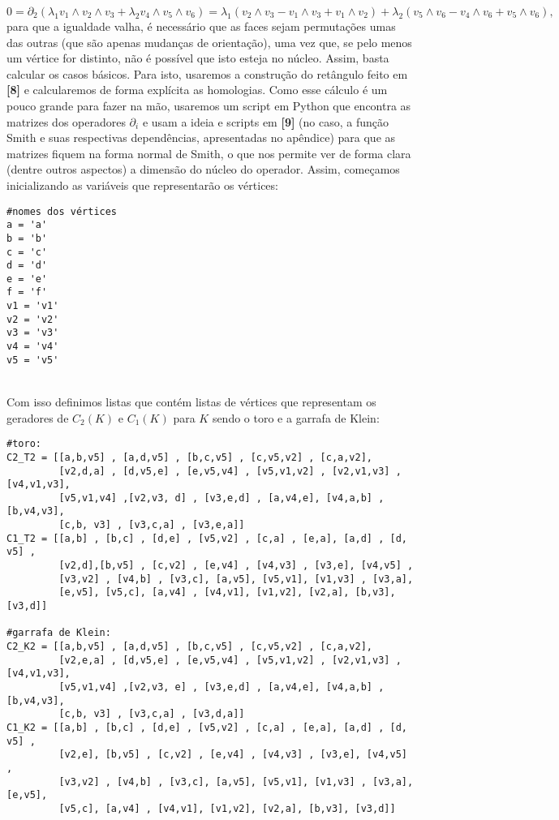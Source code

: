 \documentclass[12pt,a4paper]{article}
\theoremstyle{definition}
\begin{document}
$$0=\partial_2(\lambda_1 v_1\wedge v_2\wedge v_3+\lambda_2 v_4\wedge v_5\wedge v_6)=\lambda_1 (v_2\wedge v_3- v_1\wedge v_3+v_1\wedge v_2)+\lambda_2 (v_5\wedge v_6- v_4\wedge v_6+v_5\wedge v_6),$$ para que a igualdade valha, é necessário que as faces sejam permutações umas das outras (que são apenas mudanças de orientação), uma vez que, se pelo menos um vértice for distinto, não é possível que isto esteja no núcleo. Assim, basta calcular os casos básicos. Para isto, usaremos a construção do retângulo feito em \textbf{[8]} e calcularemos de forma explícita as homologias. Como esse cálculo é um pouco grande para fazer na mão, usaremos um script em Python que encontra as matrizes dos operadores $\partial_i$ e usam a ideia e scripts em \textbf{[9]} (no caso, a função Smith e suas respectivas dependências, apresentadas no apêndice) para que as matrizes fiquem na forma normal de Smith, o que nos permite ver de forma clara (dentre outros aspectos) a dimensão do núcleo do operador. Assim, começamos inicializando as variáveis que representarão os vértices: \\

\begin{lstlisting}[language=iPython]
#nomes dos vértices
a = 'a'
b = 'b'
c = 'c'
d = 'd'
e = 'e'
f = 'f'
v1 = 'v1'
v2 = 'v2'
v3 = 'v3'
v4 = 'v4'
v5 = 'v5'
\end{lstlisting}\ \\

Com isso definimos listas que contém listas de vértices que representam os geradores de $C_2(K)$ e $C_1(K)$ para $K$ sendo o toro e a garrafa de Klein: \\

\begin{lstlisting}[language=iPython]
#toro:
C2_T2 = [[a,b,v5] , [a,d,v5] , [b,c,v5] , [c,v5,v2] , [c,a,v2],
         [v2,d,a] , [d,v5,e] , [e,v5,v4] , [v5,v1,v2] , [v2,v1,v3] , [v4,v1,v3],
         [v5,v1,v4] ,[v2,v3, d] , [v3,e,d] , [a,v4,e], [v4,a,b] , [b,v4,v3],
         [c,b, v3] , [v3,c,a] , [v3,e,a]]
C1_T2 = [[a,b] , [b,c] , [d,e] , [v5,v2] , [c,a] , [e,a], [a,d] , [d, v5] , 
         [v2,d],[b,v5] , [c,v2] , [e,v4] , [v4,v3] , [v3,e], [v4,v5] , 
         [v3,v2] , [v4,b] , [v3,c], [a,v5], [v5,v1], [v1,v3] , [v3,a], 
         [e,v5], [v5,c], [a,v4] , [v4,v1], [v1,v2], [v2,a], [b,v3], [v3,d]]
         
#garrafa de Klein:
C2_K2 = [[a,b,v5] , [a,d,v5] , [b,c,v5] , [c,v5,v2] , [c,a,v2],
         [v2,e,a] , [d,v5,e] , [e,v5,v4] , [v5,v1,v2] , [v2,v1,v3] , [v4,v1,v3],
         [v5,v1,v4] ,[v2,v3, e] , [v3,e,d] , [a,v4,e], [v4,a,b] , [b,v4,v3],
         [c,b, v3] , [v3,c,a] , [v3,d,a]]
C1_K2 = [[a,b] , [b,c] , [d,e] , [v5,v2] , [c,a] , [e,a], [a,d] , [d, v5] ,
         [v2,e], [b,v5] , [c,v2] , [e,v4] , [v4,v3] , [v3,e], [v4,v5] , 
         [v3,v2] , [v4,b] , [v3,c], [a,v5], [v5,v1], [v1,v3] , [v3,a], [e,v5],
         [v5,c], [a,v4] , [v4,v1], [v1,v2], [v2,a], [b,v3], [v3,d]]
         
\end{lstlisting}\ \\
\end{document}
